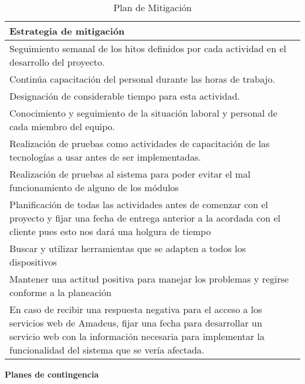 \begin{table}[h]
	\begin{center}
		\begin{tabular}{|p{14.2cm}|}
			\hline \rowcolor[RGB]{51,153,255} 
				\textcolor{blanco}{\bf Estrategia de mitigación} \\ 
			\hline 
				Seguimiento semanal de los hitos definidos por cada actividad en el desarrollo del proyecto. \\
      		\hline \rowcolor[RGB]{240,248,255} 
				Continúa capacitación del personal durante las horas de trabajo. \\
			\hline 
				Designación de considerable tiempo para esta actividad. \\ 
			\hline \rowcolor[RGB]{240,248,255}
				Conocimiento y seguimiento de la situación laboral y personal de cada miembro del equipo. \\ 
			\hline 
				Realización de pruebas como actividades de capacitación de las tecnologías a usar antes de ser implementadas. \\ 
			\hline \rowcolor[RGB]{240,248,255}
				Realización de pruebas al sistema para poder evitar el mal funcionamiento de alguno de los módulos \\ 
			\hline
				Planificación de todas las actividades antes de comenzar con el proyecto y fijar una fecha de entrega anterior a la acordada con el cliente pues esto nos dará una holgura de tiempo \\ 
			\hline \rowcolor[RGB]{240,248,255}
				Buscar y utilizar herramientas que se adapten a todos los dispositivos \\ 
			\hline
				Mantener una actitud positiva para manejar  los problemas y regirse conforme a la planeación \\ 
			\hline \rowcolor[RGB]{240,248,255}
				En caso de recibir una respuesta negativa para el acceso a los servicios web de Amadeus, fijar una fecha para desarrollar un servicio web con la información necesaria para implementar la funcionalidad del sistema que se vería afectada.  \\ 
			\hline
		\end{tabular}
	\end{center}
	\caption[Plan de Mitigación]{Plan de Mitigación} 
	\label{tab:planMitigacion}
\end{table}

\textbf{Planes de contingencia}
\newline


